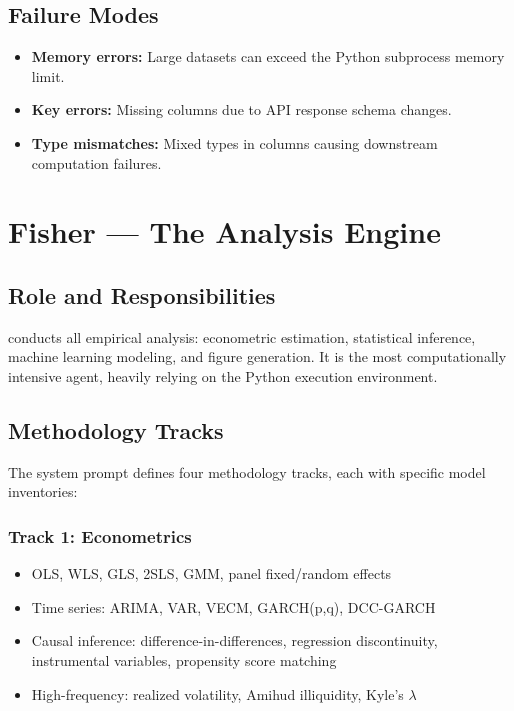 \subsection{Failure Modes}

\begin{itemize}
  \item \textbf{Memory errors:} Large datasets can exceed the Python subprocess memory limit.
  \item \textbf{Key errors:} Missing columns due to API response schema changes.
  \item \textbf{Type mismatches:} Mixed types in columns causing downstream computation failures.
\end{itemize}

\section{Fisher --- The Analysis Engine}
\label{sec:agents:fisher}

\subsection{Role and Responsibilities}

\fisher conducts all empirical analysis: econometric estimation, statistical inference, machine learning modeling, and figure generation.
It is the most computationally intensive agent, heavily relying on the Python execution environment.

\subsection{Methodology Tracks}

The system prompt defines four methodology tracks, each with specific model inventories:

\subsubsection{Track 1: Econometrics}

\begin{itemize}
  \item OLS, WLS, GLS, 2SLS, GMM, panel fixed/random effects
  \item Time series: ARIMA, VAR, VECM, GARCH(p,q), DCC-GARCH
  \item Causal inference: difference-in-differences, regression discontinuity, instrumental variables, propensity score matching
  \item High-frequency: realized volatility, Amihud illiquidity, Kyle's $\lambda$
\end{itemize}

